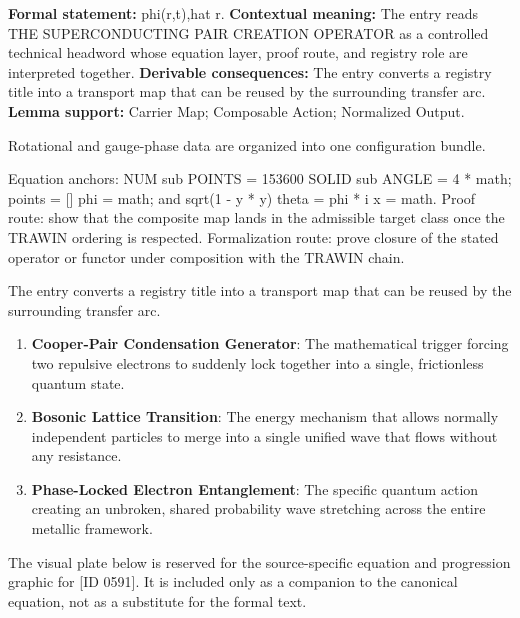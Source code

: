 \begingroup\footnotesize\setlength{\emergencystretch}{3em}\sloppy
\textbf{Formal statement:} phi(r,t),hat r. \textbf{Contextual meaning:} The entry reads THE SUPERCONDUCTING PAIR CREATION OPERATOR as a controlled technical headword whose equation layer, proof route, and registry role are interpreted together. \textbf{Derivable consequences:} The entry converts a registry title into a transport map that can be reused by the surrounding transfer arc. \textbf{Lemma support:} Carrier Map; Composable Action; Normalized Output.\par
\endgroup

Rotational and gauge-phase data are organized into one configuration bundle.

Equation anchors: NUM sub POINTS = 153600 SOLID sub ANGLE = 4 * math; points = [] phi = math; and sqrt(1 - y * y) theta = phi * i x = math. Proof route: show that the composite map lands in the admissible target class once the TRAWIN ordering is respected. Formalization route: prove closure of the stated operator or functor under composition with the TRAWIN chain.

The entry converts a registry title into a transport map that can be reused by the surrounding transfer arc.
\endgroup

\begin{enumerate}[leftmargin=1.6em,itemsep=6pt,topsep=4pt]
\item \textbf{Cooper-Pair Condensation Generator}: The mathematical trigger forcing two repulsive electrons to suddenly lock together into a single, frictionless quantum state.
\item \textbf{Bosonic Lattice Transition}: The energy mechanism that allows normally independent particles to merge into a single unified wave that flows without any resistance.
\item \textbf{Phase-Locked Electron Entanglement}: The specific quantum action creating an unbroken, shared probability wave stretching across the entire metallic framework.
\end{enumerate}

\begingroup\footnotesize\sloppy
The visual plate below is reserved for the source-specific equation and progression graphic for [ID 0591]. It is included only as a companion to the canonical equation, not as a substitute for the formal text.
\par\endgroup
\ifTZPDarkEdition
{}
\fi

